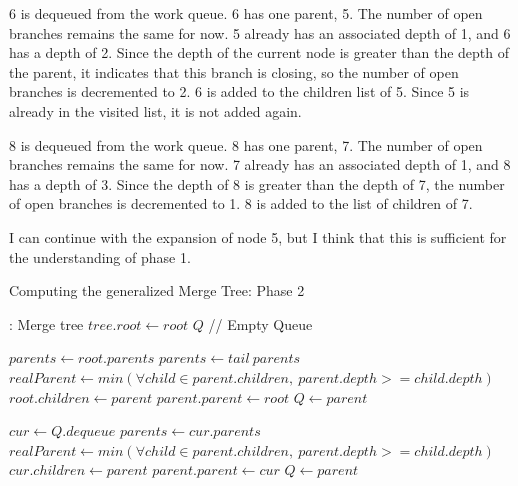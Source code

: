 6 is dequeued from the work queue. 6 has one parent, 5. The number of
open branches remains the same for now. 5 already has an associated
depth of 1, and 6 has a depth of 2. Since the depth of the current node
is greater than the depth of the parent, it indicates that this branch
is closing, so the number of open branches is decremented to 2. 6 is
added to the children list of 5. Since 5 is already in the visited list,
it is not added again.

8 is dequeued from the work queue. 8 has one parent, 7. The number of
open branches remains the same for now. 7 already has an associated
depth of 1, and 8 has a depth of 3. Since the depth of 8 is greater than
the depth of 7, the number of open branches is decremented to 1. 8 is
added to the list of children of 7.

I can continue with the expansion of node 5, but I think that this is
sufficient for the understanding of phase 1.

\begin{algorithm}
  \caption{Computing the generalized Merge Tree: Phase 2}
  \label{alg:generalized_phase_II}
  \begin{algorithmic}[1]
     : Merge tree
    \State $tree.root \gets root$
    \State $Q$ // Empty Queue

    \State $parents \gets root.parents$
    \State $parents \gets tail\ parents$
    \State $realParent \gets min(\forall child \in parent.children,\ parent.depth >= child.depth)$
    \State $root.children \gets parent$
    \State $parent.parent \gets root$
    \State $Q \gets parent$
    \EndIf
    \EndFor

    \State $cur \gets Q.dequeue$
    \State $parents \gets cur.parents$
    \State $realParent \gets min(\forall child \in parent.children,\ parent.depth >= child.depth)$
    \State $cur.children \gets parent$
    \State $parent.parent \gets cur$
    \State $Q \gets parent$
    \EndIf

    \EndFor
    \EndWhile

    \EndFunction
  \end{algorithmic}
\end{algorithm}
